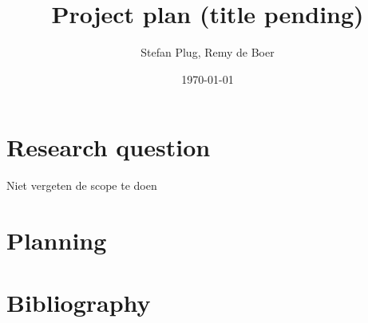 \documentclass{article}
\begin{document}
\title{Project plan (title pending)}
\author{Stefan Plug, Remy de Boer}
\date{\today}
\maketitle

\section{Research question}
Niet vergeten de scope te doen

\section{Planning}

\section{Bibliography}
\end{document}
